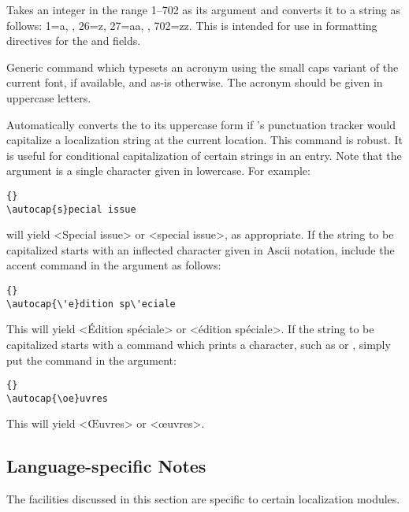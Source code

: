 \documentclass{ltxdockit}[2011/03/25]
\begin{document}
\begin{ltxsyntax}
Takes an integer in the range 1--702 as its argument and converts it to a string as follows: 1=a, \textellipsis, 26=z, 27=aa, \textellipsis, 702=zz. This is intended for use in formatting directives for the  and  fields.


Generic command which typesets an acronym using the small caps variant of the current font, if available, and as-is otherwise. The acronym should be given in uppercase letters.


Automatically converts the  to its uppercase form if 's punctuation tracker would capitalize a localization string at the current location. This command is robust. It is useful for conditional capitalization of certain strings in an entry. Note that the  argument is a single character given in lowercase. For example:

\begin{lstlisting}[style=latex]{}
\autocap{s}pecial issue
\end{lstlisting}
%
will yield <Special issue> or <special issue>, as appropriate. If the string to be capitalized starts with an inflected character given in Ascii notation, include the accent command in the  argument as follows:

\begin{lstlisting}[style=latex]{}
\autocap{\'e}dition sp\'eciale
\end{lstlisting}
%
This will yield <Édition spéciale> or <édition spéciale>. If the string to be capitalized starts with a command which prints a character, such as  or , simply put the command in the  argument:

\begin{lstlisting}[style=latex]{}
\autocap{\oe}uvres
\end{lstlisting}
%
This will yield <Œuvres> or <œuvres>.

\end{ltxsyntax}

\subsection[Language notes]{Language-specific Notes}
\label{use:loc}

The facilities discussed in this section are specific to certain localization modules.
\end{document}
